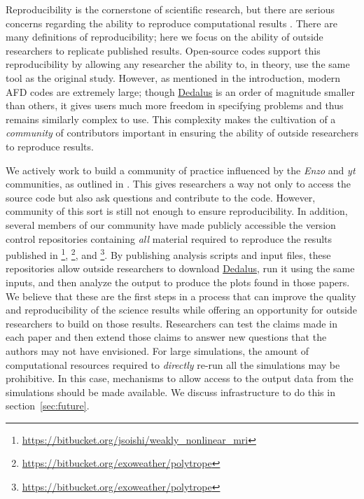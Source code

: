 \documentclass[12pt, titlepage]{aastex62}
\newcommand{\dedalus}{\href{http://dedalus-project.org}{Dedalus}}
\begin{document}
Reproducibility is the cornerstone of scientific research, but there are serious concerns regarding the ability to reproduce computational results \citep[see][and references therein]{2012ICERM_REPORT}. There are many definitions of reproducibility; here we focus on the ability of outside researchers to replicate published results. Open-source codes support this reproducibility by allowing any researcher the ability to, in theory, use the same tool as the original study. However, as mentioned in the introduction, modern AFD codes are extremely large; though \dedalus{} is an order of magnitude smaller than others, it gives users much more freedom in specifying problems and thus remains similarly complex to use. This complexity makes the cultivation of a \emph{community} of contributors important in ensuring the ability of outside researchers to reproduce results. 

We actively work to build a community of practice influenced by the \emph{Enzo} and \emph{yt} communities, as outlined in \citet{2013arXiv1301.7064T}. This gives researchers a way not only to access the source code but also ask questions and contribute to the code. However, community of this sort is still not enough to ensure reproducibility. In addition, several members of our community have made publicly accessible the version control repositories containing \emph{all} material required to reproduce the results published in \citet{2017ApJ...841....1C,2017ApJ...841....2C}\footnote{\url{https://bitbucket.org/jsoishi/weakly_nonlinear_mri}}, \citet{2017PhRvF...2h3501A}\footnote{\url{https://bitbucket.org/exoweather/polytrope}}, and \citet{2018Bordwell}\footnote{\url{https://bitbucket.org/exoweather/polytrope}}. By publishing analysis scripts and input files, these repositories allow outside researchers to download \dedalus{}, run it using the same inputs, and then analyze the output to produce the plots found in those papers. We believe that these are the first steps in a process that can improve the quality and reproducibility of the science results while offering an opportunity for outside researchers to build on those results. Researchers can test the claims made in each paper and then extend those claims to answer new questions that the authors may not have envisioned. For large simulations, the amount of computational resources required to \emph{directly} re-run all the simulations may be prohibitive. In this case, mechanisms to allow access to the output data from the simulations should be made available. We discuss infrastructure to do this in section~\ref{sec:future}.
\end{document}
